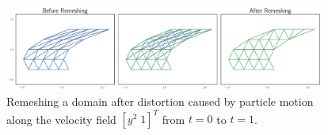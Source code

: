 \begin{figure}
  \includegraphics[width=0.9375\textwidth]
                  {../images/curved-mesh/distortion_remesh.pdf}
  \centering
  \caption{Remeshing a domain after distortion caused by particle motion
    along the velocity field \(\left[ y^2 \; 1 \right]^T\) from \(t = 0\)
    to \(t = 1\).}
  \label{fig:distortion-remesh}
\end{figure}
